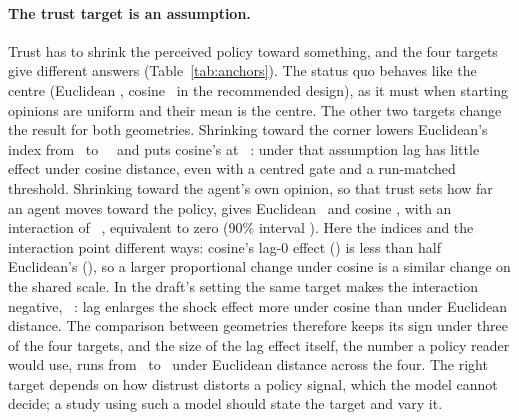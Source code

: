 \documentclass[11pt]{article}
\begin{document}
\paragraph{The trust target is an assumption.}
Trust has to shrink the perceived policy toward something, and the four targets give different answers (Table~\ref{tab:anchors}).
The status quo behaves like the centre (Euclidean \VTCentredRunStatusQuoEucIdx, cosine \VTCentredRunStatusQuoCosIdx\ in the recommended design), as it must when starting opinions are uniform and their mean is the centre.
The other two targets change the result for both geometries.
Shrinking toward the corner lowers Euclidean's index from \VTCentredRunCentreEucIdx\ to \VTCentredRunCornerEucIdx\ \VTCentredRunCornerEucIdxCI\ and puts cosine's at \VTCentredRunCornerCosIdx\ \VTCentredRunCornerCosIdxCI: under that assumption lag has little effect under cosine distance, even with a centred gate and a run-matched threshold.
Shrinking toward the agent's own opinion, so that trust sets how far an agent moves toward the policy, gives Euclidean \VTCentredRunOwnEucIdx\ and cosine \VTCentredRunOwnCosIdx, with an interaction of \VTCentredRunOwnInter\ \VTCentredRunOwnCI, equivalent to zero (90\% interval \VTCentredRunOwnCINinety).
Here the indices and the interaction point different ways: cosine's lag-0 effect (\VTCentredRunOwnCosZero) is less than half Euclidean's (\VTCentredRunOwnEucZero), so a larger proportional change under cosine is a similar change on the shared scale.
In the draft's setting the same target makes the interaction negative, \VTUnitRawOwnInter\ \VTUnitRawOwnCI: lag enlarges the shock effect more under cosine than under Euclidean distance.
The comparison between geometries therefore keeps its sign under three of the four targets, and the size of the lag effect itself, the number a policy reader would use, runs from \VTargetEucMin\ to \VTargetEucMax\ under Euclidean distance across the four.
The right target depends on how distrust distorts a policy signal, which the model cannot decide; a study using such a model should state the target and vary it.

\begin{table}[t]
\centering\small
\caption{Trust targets in the recommended design (centred gate, run-matched threshold recalibrated for each target, anchor pull): lag index per geometry (95\% CI), relative shock effect at lags 0 and 40 for Euclidean (E) and cosine (C), and the paired interaction; $^{=}$ marks equivalence to zero.}
\label{tab:anchors}

\end{table}
\end{document}
